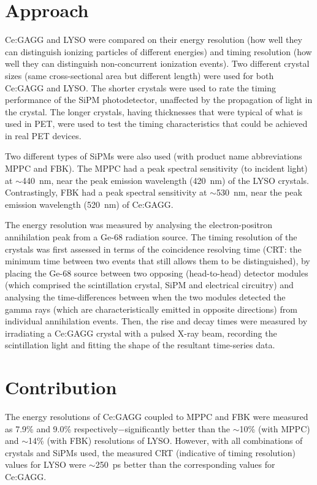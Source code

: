 \documentclass[12pt,a4paper]{article}
\begin{document}
\section*{Approach}
Ce:GAGG and LYSO were compared on their energy resolution (how well they can distinguish ionizing particles of different energies) and timing resolution (how well they can distinguish non-concurrent ionization events).
Two different crystal sizes (same cross-sectional area but different length) were used for both Ce:GAGG and LYSO.
The shorter crystals were used to rate the timing performance of the SiPM photodetector, unaffected by the propagation of light in the crystal. 
The longer crystals, having thicknesses that were typical of what is used in PET, were used to test the timing characteristics that could be achieved in real PET devices.

\medskip
Two different types of SiPMs were also used (with product name abbreviations MPPC and FBK). The MPPC had a peak spectral sensitivity (to incident light) at $\sim$440~nm, near the peak emission wavelength (420~nm) of the LYSO crystals. Contrastingly, FBK had a peak spectral sensitivity at $\sim$530~nm, near the peak emission wavelength (520~nm) of Ce:GAGG.

\medskip
\bgroup\obeylines
The energy resolution was measured by analysing the electron-positron annihilation peak from a Ge-68
\noindent radiation source. The timing resolution of the crystals was first assessed in terms of the coincidence resolving time (CRT: the minimum time between two events that still allows them to be distinguished), by placing the Ge-68 source between two opposing (head-to-head) detector modules (which comprised the scintillation crystal, SiPM and electrical circuitry) and analysing the time-differences between when the two modules detected the gamma rays (which are characteristically emitted in opposite directions) from individual annihilation events. Then, the rise and decay times were measured by irradiating a Ce:GAGG crystal with a pulsed X-ray beam, recording the scintillation light and fitting the shape of the resultant time-series data.
\egroup
\section*{Contribution}
The energy resolutions of Ce:GAGG coupled to MPPC and FBK were measured as 7.9\% and 9.0\% respectively$-$significantly better than the $\sim$10\% (with MPPC) and $\sim$14\% (with FBK) resolutions of LYSO. However, with all combinations of crystals and SiPMs used, the measured CRT (indicative of timing resolution) values for LYSO were $\sim$250~ps better than the corresponding values for Ce:GAGG.
\end{document}
